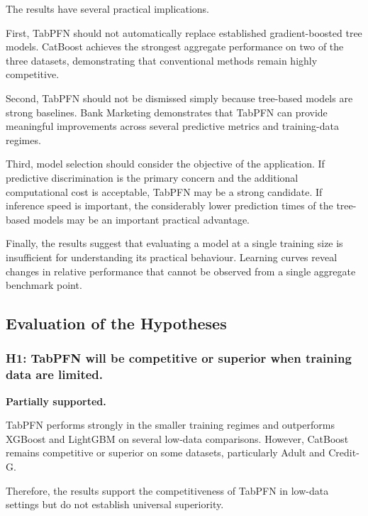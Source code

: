 The results have several practical implications.



First, TabPFN should not automatically replace established gradient-boosted tree models. CatBoost achieves the strongest aggregate performance on two of the three datasets, demonstrating that conventional methods remain highly competitive.



Second, TabPFN should not be dismissed simply because tree-based models are strong baselines. Bank Marketing demonstrates that TabPFN can provide meaningful improvements across several predictive metrics and training-data regimes.



Third, model selection should consider the objective of the application. If predictive discrimination is the primary concern and the additional computational cost is acceptable, TabPFN may be a strong candidate. If inference speed is important, the considerably lower prediction times of the tree-based models may be an important practical advantage.



Finally, the results suggest that evaluating a model at a single training size is insufficient for understanding its practical behaviour. Learning curves reveal changes in relative performance that cannot be observed from a single aggregate benchmark point.



\subsection{Evaluation of the Hypotheses}



\subsubsection{H1: TabPFN will be competitive or superior when training data are limited.}



\textbf{Partially supported.}



TabPFN performs strongly in the smaller training regimes and outperforms XGBoost and LightGBM on several low-data comparisons. However, CatBoost remains competitive or superior on some datasets, particularly Adult and Credit-G.



Therefore, the results support the competitiveness of TabPFN in low-data settings but do not establish universal superiority.



